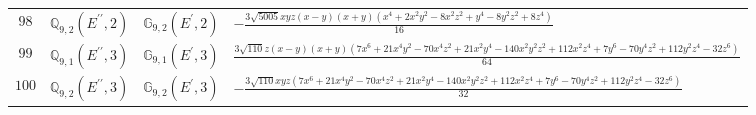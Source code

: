 \documentclass[fleqn,8pt,landscape]{jsarticle}
\begin{document}
\begin{table}[ht!]
\begin{center}
\begin{tabular}{cccl}
$ 98 $ & $ \mathbb{Q}_{9,2}(E^{\prime\prime},2) $ & $ \mathbb{G}_{9,2}(E^{\prime},2) $ & $ - \frac{3 \sqrt{5005} x y z \left(x - y\right) \left(x + y\right) \left(x^{4} + 2 x^{2} y^{2} - 8 x^{2} z^{2} + y^{4} - 8 y^{2} z^{2} + 8 z^{4}\right)}{16} $ \\
$ 99 $ & $ \mathbb{Q}_{9,1}(E^{\prime\prime},3) $ & $ \mathbb{G}_{9,1}(E^{\prime},3) $ & $ \frac{3 \sqrt{110} z \left(x - y\right) \left(x + y\right) \left(7 x^{6} + 21 x^{4} y^{2} - 70 x^{4} z^{2} + 21 x^{2} y^{4} - 140 x^{2} y^{2} z^{2} + 112 x^{2} z^{4} + 7 y^{6} - 70 y^{4} z^{2} + 112 y^{2} z^{4} - 32 z^{6}\right)}{64} $ \\
$ 100 $ & $ \mathbb{Q}_{9,2}(E^{\prime\prime},3) $ & $ \mathbb{G}_{9,2}(E^{\prime},3) $ & $ - \frac{3 \sqrt{110} x y z \left(7 x^{6} + 21 x^{4} y^{2} - 70 x^{4} z^{2} + 21 x^{2} y^{4} - 140 x^{2} y^{2} z^{2} + 112 x^{2} z^{4} + 7 y^{6} - 70 y^{4} z^{2} + 112 y^{2} z^{4} - 32 z^{6}\right)}{32} $ \\
 \hline \hline
\end{tabular}
\end{center}
\end{table}
\end{document}
